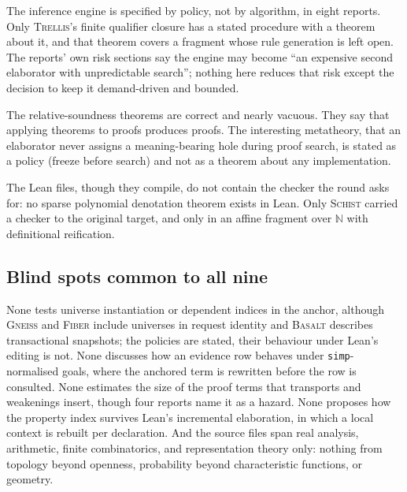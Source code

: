 \documentclass[11pt,a4paper]{article}
\newcommand{\code}[1]{\nolinkurl{#1}}
\newcommand{\Bs}{\textsc{Basalt}}
\newcommand{\Fb}{\textsc{Fiber}}
\newcommand{\Gn}{\textsc{Gneiss}}
\newcommand{\Sc}{\textsc{Schist}}
\newcommand{\Tr}{\textsc{Trellis}}
\newcommand{\N}{\mathbb N}
\theoremstyle{definition}
\begin{document}
The inference engine is specified by policy, not by algorithm, in eight reports. Only \Tr's finite qualifier closure has a stated procedure with a theorem about it, and that theorem covers a fragment whose rule generation is left open. The reports' own risk sections say the engine may become ``an expensive second elaborator with unpredictable search''; nothing here reduces that risk except the decision to keep it demand-driven and bounded.

The relative-soundness theorems are correct and nearly vacuous. They say that applying theorems to proofs produces proofs. The interesting metatheory, that an elaborator never assigns a meaning-bearing hole during proof search, is stated as a policy (freeze before search) and not as a theorem about any implementation.

The Lean files, though they compile, do not contain the checker the round asks for: no sparse polynomial denotation theorem exists in Lean. Only \Sc{} carried a checker to the original target, and only in an affine fragment over $\N$ with definitional reification.

\subsection{Blind spots common to all nine}
None tests universe instantiation or dependent indices in the anchor, although \Gn{} and \Fb{} include universes in request identity and \Bs{} describes transactional snapshots; the policies are stated, their behaviour under Lean's editing is not. None discusses how an evidence row behaves under \code{simp}-normalised goals, where the anchored term is rewritten before the row is consulted. None estimates the size of the proof terms that transports and weakenings insert, though four reports name it as a hazard. None proposes how the property index survives Lean's incremental elaboration, in which a local context is rebuilt per declaration. And the source files span real analysis, arithmetic, finite combinatorics, and representation theory only: nothing from topology beyond openness, probability beyond characteristic functions, or geometry.
\end{document}
